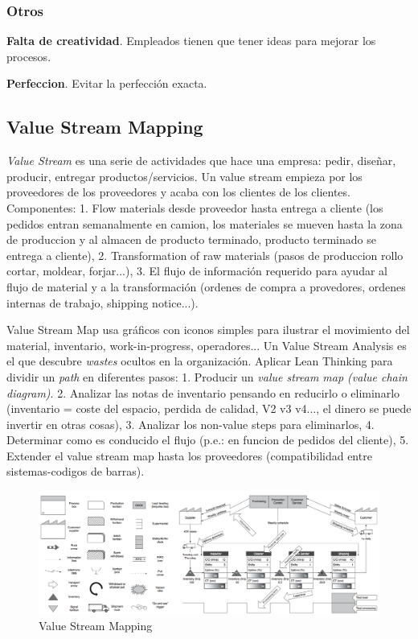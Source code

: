 \documentclass[]{article}
\begin{document}
\subsubsection{Otros}

\textbf{Falta de creatividad}. Empleados tienen que tener ideas para mejorar los procesos.

\textbf{Perfeccion}. Evitar la perfección exacta. 

\subsection{Value Stream Mapping} 

\textit{Value Stream} es una serie de actividades que hace una empresa: pedir, diseñar, producir, entregar productos/servicios. Un value stream empieza por los proveedores de los proveedores y acaba con los clientes de los clientes. Componentes: 1. Flow materials desde proveedor hasta entrega a cliente (los pedidos entran semanalmente en camion, los materiales se mueven hasta la zona de produccion y al almacen de producto terminado, producto terminado se entrega a cliente), 2. Transformation of raw materials (pasos de produccion rollo cortar, moldear, forjar...), 3. El flujo de información requerido para ayudar al flujo de material y a la transformación (ordenes de compra a provedores, ordenes internas de trabajo, shipping notice...).

Value Stream Map usa gráficos con iconos simples para ilustrar el movimiento del material, inventario, work-in-progress, operadores... Un Value Stream Analysis es el que descubre \textit{wastes} ocultos en la organización. Aplicar Lean Thinking para dividir un \textit{path} en diferentes pasos: 1. Producir un \textit{value stream map (value chain diagram)}. 2. Analizar las notas de inventario pensando en reducirlo o eliminarlo (inventario = coste del espacio, perdida de calidad, V2 v3 v4..., el dinero se puede invertir en otras cosas), 3. Analizar los non-value steps para eliminarlos, 4. Determinar como es conducido el flujo (p.e.: en funcion de pedidos del cliente), 5. Extender el value stream map hasta los proveedores (compatibilidad entre sistemas-codigos de barras).

\begin{figure}[ht!]
	\centering
	\includegraphics[width=170mm]{imagenes/ValueStreamMapping.png}
	\caption{Value Stream Mapping}
	\label{fig:ValueStreamMapping}
\end{figure}
\end{document}
